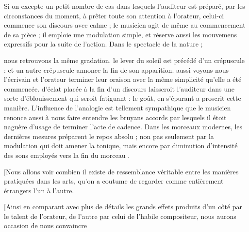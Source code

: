 \documentclass[11pt,a4paper]{article}
\begin{document}
Si on excepte un petit nombre de cas dans lesquels l'auditeur est
préparé, par les circonstances du moment, à prêter toute son attention à
l'orateur, celui-ci commence son discours avec calme ; le musicien agit
de même au commencement de sa pièce ; il emploie une modulation simple,
et  réserve  aussi les mouvemens
expressifs pour la suite de l'action. Dans le  spectacle de
la nature ;

nous retrouvons la même gradation. le lever du soleil est précédé d'un
crépuscule : et un autre crépuscule  annonce la fin de
son apparition.  aussi voyons nous l'écrivain
et l'orateur terminer leur oraison avec la même simplicité
qu'elle \struck{\ill{}} a été commencée.  d'éclat
placée à la fin d'un discours laisseroit l'auditeur dans une sorte
d'éblouissement qui seroit fatiguant :  le goût, en s'épurant a proscrit cette manière.
L'influence de l'analogie est tellement sympathique que le musicien
renonce aussi à nous faire entendre les bruyans accords par lesquels il
étoit naguère d'usage de terminer l'acte de cadence. Dans les morceaux
 modernes,  les dernières
mesures préparent le repos absolu ; non pas seulement par la modulation
qui doit amener la tonique, mais encore par  diminution
d'intensité des sons  employés vers la fin du morceau
.

[Nous allons voir combien il existe de ressemblance véritable entre les
manières  pratiquées  
dans les arts, qu'on a coutume de regarder comme 
entièrement étrangers l'un à l'autre.

[Ainsi en comparant avec plus de détails  les grands
effets produits  d'un côté par le talent de l'orateur, de
l'autre par celui de l'habile compositeur, nous aurons occasion de nous
convaincre 
\end{document}
